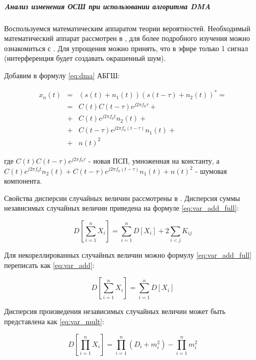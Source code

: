 \subparagraph{Aнализ изменения ОСШ при использовании алгоритма DMA}
\label{sssec:dma_noise}

Воспользуемся математическим аппаратом теории вероятностей. Необходимый математический аппарат
рассмотрен в \cite{ventcel}, для более подробного изучения можно ознакомиться с \cite{feller}.
Для упрощения можно принять, что в эфире только 1 сигнал (интерференция будет создавать окрашенный шум).

Добавим в формулу \ref{eq:dma} АБГШ:
\begin{center}
\begin{eqnarray}
	\label{eq:dma_general}
	x_{n}(t) & = & (s(t)+n_{1}(t))(s(t-\tau)+n_{2}(t))^{*}=\nonumber \\
	 & = & C(t)C(t-\tau)e^{j2{\pi}f_{0}{\tau}}+\nonumber \\
	 & + & C(t)e^{j2{\pi}f_{0}t}n_{2}(t)+\label{eq:dma_noise_1}\\
	 & + & C(t-\tau)e^{j2{\pi}f_{0}(t-\tau)}n_{1}(t)+\nonumber \\
	 & + & n(t)^{2}\nonumber 
\end{eqnarray}
\end{center}
где $C(t)C(t-\tau)e^{j2{\pi}f_{0}{\tau}}$ - новая ПСП, умноженная на константу, а
$C(t)e^{j2{\pi}f_{0}t}n_{2}(t)+C(t-\tau)e^{j2{\pi}f_{0}(t-\tau)}n_{1}(t) + n(t)^{2}$ -
шумовая компонента.

Свойства дисперсии случайных величин рассмотрены в \cite{ventcel}. Дисперсия суммы 
независимых случайных величин приведена на формуле \ref{eq:var_add_full}:
\begin{center}
\begin{equation}
	\label{eq:var_add_full}
	D[\sum\limits_{i=1}^{n}{X_i}]=\sum\limits_{i=1}^{n}{D[X_i]} + 2\sum\limits_{i<j}{K_{ij}}
\end{equation}
\end{center}

Для некореллированных случайных величин можно формулу \ref{eq:var_add_full} переписать как \ref{eq:var_add}:
\begin{center}
\begin{equation}
	\label{eq:var_add}
	D[\sum\limits_{i=1}^{n}{X_i}]=\sum\limits_{i=1}^{n}{D[X_i]}
\end{equation}
\end{center}

Дисперсия произведения независимых случайных величин может быть представлена как \ref{eq:var_mult}:
\begin{center}
\begin{equation}
	\label{eq:var_mult}
	D[\prod\limits_{i=1}^{n}{X_i}]=\prod\limits_{i=1}^{n}{(D_i + m_{i}^{2})} - \prod\limits_{i=1}^{n}{m_{i}^{2}}
\end{equation}
\end{center}

